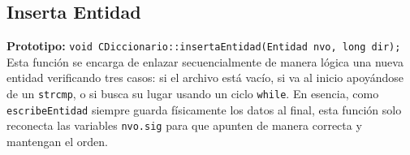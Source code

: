 \documentclass[12pt]{article}
\begin{document}
{}
\subsection*{Inserta Entidad}
\textbf{Prototipo:} \verb|void CDiccionario::insertaEntidad(Entidad nvo, long dir);|\\
Esta función se encarga de enlazar secuencialmente de manera
lógica una nueva entidad verificando tres casos: si el archivo
está vacío, si va al inicio apoyándose de un \verb|strcmp|,
o si busca su lugar usando un ciclo \verb|while|. En esencia,
como \verb|escribeEntidad| siempre guarda físicamente los datos
al final, esta función solo reconecta las variables \verb|nvo.sig|
para que apunten de manera correcta y mantengan el orden.
\newpage

\end{document}
